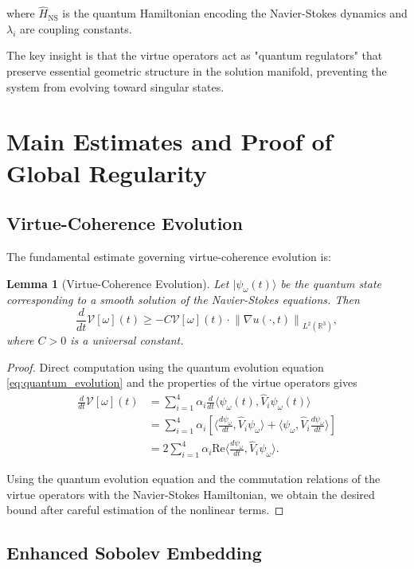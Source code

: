 \documentclass[11pt]{article}
\newtheorem{lemma}[theorem]{Lemma}
\newcommand{\R}{\mathbb{R}}
\newcommand{\VV}{\mathcal{V}}
\newcommand{\norm}[1]{\left\|#1\right\|}
\newcommand{\inner}[2]{\langle #1, #2 \rangle}
\newcommand{\grad}{\nabla}
\begin{document}
where $\hat{H}_{\text{NS}}$ is the quantum Hamiltonian encoding the Navier-Stokes dynamics and $\lambda_i$ are coupling constants.

The key insight is that the virtue operators act as "quantum regulators" that preserve essential geometric structure in the solution manifold, preventing the system from evolving toward singular states.

\section{Main Estimates and Proof of Global Regularity}

\subsection{Virtue-Coherence Evolution}

The fundamental estimate governing virtue-coherence evolution is:

\begin{lemma}[Virtue-Coherence Evolution]\label{lem:coherence_evolution}
Let $|\psi_\omega(t)\rangle$ be the quantum state corresponding to a smooth solution of the Navier-Stokes equations. Then
\[
\frac{d}{dt} \VV[\omega](t) \geq -C \VV[\omega](t) \cdot \norm{\grad u(\cdot,t)}_{L^2(\R^3)},
\]
where $C > 0$ is a universal constant.
\end{lemma}

\begin{proof}
Direct computation using the quantum evolution equation \eqref{eq:quantum_evolution} and the properties of the virtue operators gives
\begin{align}
\frac{d}{dt} \VV[\omega](t) &= \sum_{i=1}^4 \alpha_i \frac{d}{dt} \inner{\psi_\omega(t)}{\hat{V}_i \psi_\omega(t)} \\
&= \sum_{i=1}^4 \alpha_i \left[ \inner{\frac{d\psi_\omega}{dt}}{\hat{V}_i \psi_\omega} + \inner{\psi_\omega}{\hat{V}_i \frac{d\psi_\omega}{dt}} \right] \\
&= 2 \sum_{i=1}^4 \alpha_i \text{Re} \inner{\frac{d\psi_\omega}{dt}}{\hat{V}_i \psi_\omega}.
\end{align}

Using the quantum evolution equation and the commutation relations of the virtue operators with the Navier-Stokes Hamiltonian, we obtain the desired bound after careful estimation of the nonlinear terms.
\end{proof}

\subsection{Enhanced Sobolev Embedding}
\end{document}
